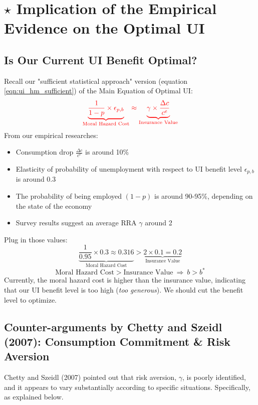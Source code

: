 \section{$\star$ Implication of the Empirical Evidence on the Optimal UI}
    
    \subsection{Is Our Current UI Benefit Optimal?}
        Recall our "sufficient statistical approach" version (equation \ref{eqn:ui_hm_sufficient}) of the Main Equation of Optimal UI:
        \begin{equation*}
        \color{red}
            \underbrace{\frac{1}{1-p}\times{\epsilon_{p,b}}}_{\text{Moral\ Hazard\ Cost}} \approx \underbrace{\gamma \times \frac{\Delta c}{c^e}}_{\text{Insurance\ Value}}
        \end{equation*}
        From our empirical researches:
        \begin{itemize}
            \item Consumption drop $\frac{\Delta c}{c^e}$ is around 10\%
            \item Elasticity of probability of unemployment with respect to UI benefit level $\epsilon_{p,b}$ is around 0.3
            \item The probability of being employed $(1-p)$ is around 90-95\%, depending on the state of the economy
            \item Survey results suggest an average RRA $\gamma$ around 2
        \end{itemize}
        Plug in those values:
        $$\underbrace{\frac{1}{0.95}\times{0.3} \approx 0.316}_{\text{Moral\ Hazard\ Cost}} > \underbrace{2 \times 0.1 = 0.2}_{\text{Insurance\ Value}}$$
        $$\text{Moral\ Hazard\ Cost} > \text{Insurance\ Value}\ \Rightarrow\ b>b^*$$
        Currently, the moral hazard cost is higher than the insurance value, indicating that our UI benefit level is too high (\emph{too generous}). We should cut the benefit level to optimize.
        
    \subsection{Counter-arguments by Chetty and Szeidl (2007): Consumption Commitment \& Risk Aversion}
        Chetty and Szeidl (2007) pointed out that risk aversion, $\gamma$, is poorly identified, and it appears to vary substantially according to specific situations. Specifically,  as explained below.
